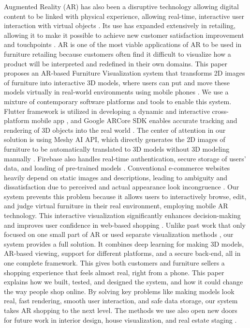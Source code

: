 \documentclass[12pt, a4paper]{article}
\begin{document}
Augmented Reality (AR) has also been a disruptive technology allowing digital content to be linked with physical experience, allowing real-time, interactive user interaction with virtual objects \cite{ref1}. Its use has expanded extensively in retailing, allowing it to make it possible to achieve new customer satisfaction improvement and touchpoints \cite{ref15,ref16}. AR is one of the most viable applications of AR to be used in furniture retailing because customers often find it difficult to visualize how a product will be interpreted and redefined in their own domains. This paper proposes an AR-based Furniture Visualization system that transforms 2D images of furniture into interactive 3D models, where users can put and move these models virtually in real-world environments using mobile phones \cite{ref11,ref12}. We use a mixture of contemporary software platforms and tools to enable this system. Flutter framework is utilized in developing a dynamic and interactive cross-platform mobile app \cite{ref3,ref9,ref17}, and Google ARCore SDK enables accurate tracking and rendering of 3D objects into the real world \cite{ref2,ref7}. The center of attention in our solution is using Meshy AI API, which directly generates the 2D images of furniture to be automatically translated to 3D models without 3D modeling manually \cite{ref5}. Firebase also handles real-time authentication, secure storage of users' data, and loading of pre-trained models \cite{ref4,ref18,ref19}. Conventional e-commerce websites heavily depend on static images and descriptions, leading to ambiguity and dissatisfaction due to perceived and actual appearance look incongruence \cite{ref8,ref11}. Our system prevents this problem because it allows users to interactively browse, edit, and judge virtual furniture in their real environment, employing mobile AR technology. This interactive visualization significantly enhances decision-making and improves user confidence in web-based shopping \cite{ref6,ref14}. Unlike past work that only focused on one small part of AR or used separate visualization methods \cite{ref13}, our system provides a full solution. It combines deep learning for making 3D models, AR-based viewing, support for different platforms, and a secure back-end, all in one complete framework. This gives both customers and furniture sellers a shopping experience that feels almost real, right from a phone. This paper explains how we built, tested, and designed the system, and how it could change the way people shop online. By solving key problems like making models look real, fast rendering, smooth user interaction, and safe data storage, our system takes AR shopping to the next level. The methods we use also open new doors for future work in interior design, house visualization, and real estate staging \cite{ref6,ref13,ref20}.
\end{document}
